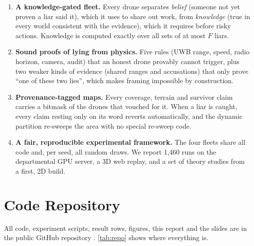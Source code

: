 \begin{enumerate}
  \item \textbf{A knowledge-gated fleet.} Every drone separates \emph{belief} (someone not yet proven a liar said it),
        which it uses to share out work, from \emph{knowledge} (true in every world consistent with the evidence),
        which it requires before risky actions. Knowledge is computed exactly over all sets of at most $F$ liars.
  \item \textbf{Sound proofs of lying from physics.} Five rules (UWB range, speed, radio horizon, camera, audit) that
        an honest drone provably cannot trigger, plus two weaker kinds of evidence (shared ranges and accusations)
        that only prove ``one of these two lies'', which makes framing impossible by construction.
  \item \textbf{Provenance-tagged maps.} Every coverage, terrain and survivor claim carries a bitmask of the drones
        that vouched for it. When a liar is caught, every claim resting only on its word reverts automatically, and
        the dynamic partition re-sweeps the area with no special re-sweep code.
  \item \textbf{A fair, reproducible experimental framework.} The four fleets share all code and, per seed, all
        random draws. We report 1,460 runs on the departmental GPU server, a 3D web replay, and a set of theory
        studies from a first, 2D build.
\end{enumerate}

\section{Code Repository}
\label{sec:code}

All code, experiment scripts, result rows, figures, this report and the slides are in the public GitHub repository
\repolink. \autoref{tab:repo} shows where everything is.


